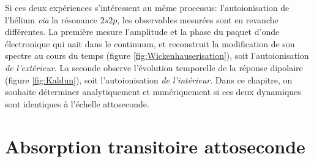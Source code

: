 Si ces deux expériences s'intéressent au même processus: l'autoionisation de l'hélium \textit{via} la résonance $2s2p$, les observables mesurées sont en revanche différentes. La première mesure l'amplitude et la phase du paquet d'onde électronique qui nait dans le continuum, et reconstruit la modification de son spectre au cours du temps (figure \ref{fig:Wickenhauserisation}), soit l'autoionisation \textit{de l'extérieur}. La seconde observe l'évolution temporelle de la réponse dipolaire (figure \ref{fig:Kaldun}), soit l'autoionisation \textit{de l'intérieur}. Dans ce chapitre, on souhaite déterminer analytiquement et numériquement si ces deux dynamiques sont identiques à l'échelle attoseconde.

\section{Absorption transitoire attoseconde}
